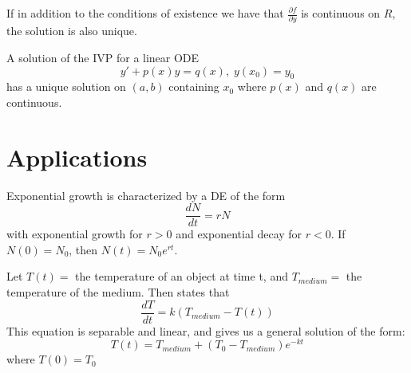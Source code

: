 \documentclass[12pt, a4paper, oneside, openright, titlepage]{book}
\begin{document}



\begin{thm}[Uniqueness]
        If in addition to the conditions of existence we have that $\frac{\partial f}{\partial y}$ is continuous on $R$, the solution is also unique.
\end{thm}




\begin{rmk}
        A solution of the IVP for a linear ODE \begin{equation}
                y' + p(x)y = q(x),\;y(x_0)=y_0
        \end{equation}
        has a unique solution on $(a,b)$ containing $x_0$ where $p(x)$ and $q(x)$ are continuous.
\end{rmk}




\section{Applications}


\begin{defn}
        Exponential growth is characterized by a DE of the form \begin{equation}
                \frac{dN}{dt} = rN
        \end{equation}
        with exponential growth for $r > 0$ and exponential decay for $r < 0$. If $N(0) = N_0$, then $N(t) = N_0e^{rt}$.
\end{defn}



\begin{defn}
        Let $T(t) = $ the temperature of an object at time t, and $T_{medium} = $ the temperature of the medium. Then  states that \begin{equation}
                \frac{dT}{dt} = k(T_{medium}-T(t))
        \end{equation}
        This equation is separable and linear, and gives us a general solution of the form: \begin{equation}
                T(t) = T_{medium} + (T_0 - T_{medium})e^{-kt}
        \end{equation}
        where $T(0) = T_0$
\end{defn}


\end{document}
